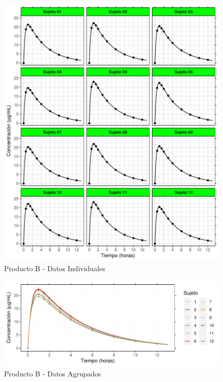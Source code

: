 \documentclass[]{article}
\begin{document}
\begin{figure}[H]

{\centering \includegraphics{parcial_1_files/figure-latex/unnamed-chunk-16-1} 

}

\caption{Producto B - Datos Individuales}\label{fig:unnamed-chunk-16}
\end{figure}

\begin{figure}[H]

{\centering \includegraphics{parcial_1_files/figure-latex/unnamed-chunk-17-1} 

}

\caption{Producto B - Datos Agrupados}\label{fig:unnamed-chunk-17}
\end{figure}
\end{document}
